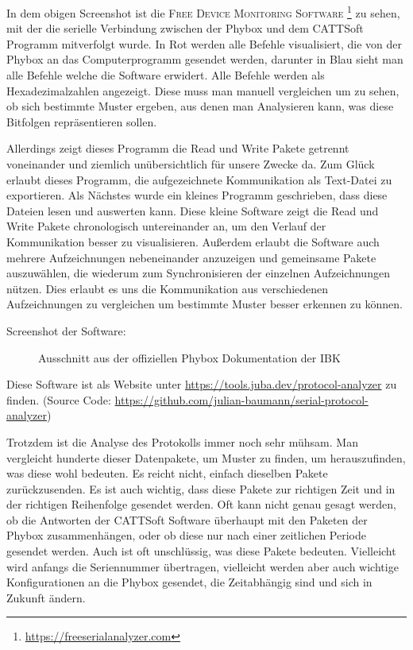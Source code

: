 \begin{figure}[htb]
    \centering
\end{figure}


In dem obigen Screenshot ist die \textsc{Free Device Monitoring Software} \footnote{\url{https://freeserialanalyzer.com}} zu sehen, mit der die serielle Verbindung zwischen der Phybox und dem CATTSoft Programm mitverfolgt wurde. In Rot werden alle Befehle visualisiert, die von der Phybox an das Computerprogramm gesendet werden, darunter in Blau sieht man alle Befehle welche die Software erwidert. Alle Befehle werden als Hexadezimalzahlen angezeigt. Diese muss man manuell vergleichen um zu sehen, ob sich bestimmte Muster ergeben, aus denen man Analysieren kann, was diese Bitfolgen repräsentieren sollen.

Allerdings zeigt dieses Programm die Read und Write Pakete getrennt voneinander und ziemlich unübersichtlich für unsere Zwecke da. Zum Glück erlaubt dieses Programm, die aufgezeichnete Kommunikation als Text-Datei zu exportieren. Als Nächstes wurde ein kleines Programm geschrieben, dass diese Dateien lesen und auswerten kann. Diese kleine Software zeigt die Read und Write Pakete chronologisch untereinander an, um den Verlauf der Kommunikation besser zu visualisieren. Außerdem erlaubt die Software auch mehrere Aufzeichnungen nebeneinander anzuzeigen und gemeinsame Pakete auszuwählen, die wiederum zum Synchronisieren der einzelnen Aufzeichnungen nützen. Dies erlaubt es uns die Kommunikation aus verschiedenen Aufzeichnungen zu vergleichen um bestimmte Muster besser erkennen zu können.

\clearpage

Screenshot der Software:

\begin{figure}[htb]
    \centering
    \caption{Ausschnitt aus der offiziellen Phybox Dokumentation der \ac{IBK}}
\end{figure}

Diese Software ist als Website unter \url{https://tools.juba.dev/protocol-analyzer} zu finden. (Source Code: \url{https://github.com/julian-baumann/serial-protocol-analyzer})

Trotzdem ist die Analyse des Protokolls immer noch sehr mühsam. Man vergleicht hunderte dieser Datenpakete, um Muster zu finden, um herauszufinden, was diese wohl bedeuten. Es reicht nicht, einfach dieselben Pakete zurückzusenden. Es ist auch wichtig, dass diese Pakete zur richtigen Zeit und in der richtigen Reihenfolge gesendet werden. Oft kann nicht genau gesagt werden, ob die Antworten der CATTSoft Software überhaupt mit den Paketen der Phybox zusammenhängen, oder ob diese nur nach einer zeitlichen Periode gesendet werden. Auch ist oft unschlüssig, was diese Pakete bedeuten. Vielleicht wird anfangs die Seriennummer übertragen, vielleicht werden aber auch wichtige Konfigurationen an die Phybox gesendet, die Zeitabhängig sind und sich in Zukunft ändern.

